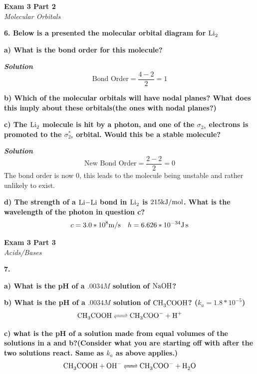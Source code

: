 \documentclass{article}
\begin{document}
    \begin{center}
        \textbf{Exam 3 Part 2}\\
        \textit{Molecular Orbitals}
    \end{center}
    \textbf{6. Below is a presented the molecular orbital diagram for $\ce{Li2}$}

    \textbf{a) What is the bond order for this molecule?}

    \textbf{\textit{Solution}}
    $$\text{Bond Order} = \dfrac{4 - 2}{2} = 1$$

    \textbf{b) Which of the molecular orbitals will have nodal planes? What does this imply about these orbitals(the ones with nodal planes?)}

    \textbf{c) The $\ce{Li2}$ molecule is hit by a photon, and one of the $\sigma_{2s}$ electrons is promoted to the $\sigma_{2s}^{*}$ orbital. Would this be a stable molecule? }

    \textbf{\textit{Solution}}
    $$\text{New Bond Order} = \dfrac{2 - 2}{2} = 0$$
    The bond order is now 0, this leads to the molecule being unstable and rather unlikely to exist.


    \textbf{d) The strength of a $\ce{Li-Li}$ bond in $\ce{Li2}$ is $215 \si[per-mode=symbol]{\kilo\joule\per\mole}$. What is the wavelength of the photon in question c?}
    $$ c = 3.0 * 10^{8} \si[per-mode=symbol]{\meter\per\second} \quad h = 6.626 * 10^{-34} \si{\joule\second}$$

    \pagebreak

    \begin{center}
        \textbf{Exam 3 Part 3}\\
        \textit{Acids/Bases}
    \end{center}
    \textbf{7.}

    \textbf{a) What is the pH of a $.0034 M$ solution of         $\ce{NaOH}$?}

    \textbf{b) What is the pH of a $.0034 M$ solution of         $\ce{CH3COOH}$? ($k_{a} = 1.8 * 10^{-5}$)}
    $$\ce{CH3COOH <=> CH3COO- + H+}$$

    \textbf{c) what is the pH of a solution made from equal volumes of the solutions in a and b?(Consider what you are starting off with after the two solutions react. Same as $k_{a}$ as above applies.)}
    $$\ce{CH3COOH + OH- <=> CH3COO- + H2O}$$
\end{document}
